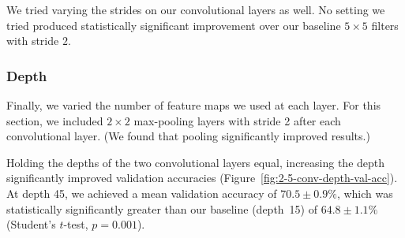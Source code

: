 \documentclass{article}
\begin{document}
\begin{multicols}{2}

We tried varying the strides on our convolutional layers as well.
No setting we tried produced statistically significant improvement
over our baseline $5\times 5$ filters with stride $2$.


\subsubsection{Depth}

Finally, we varied the number of feature maps
we used at each layer.
For this section,
we included $2\times 2$ max-pooling layers with stride 2
after each convolutional layer.
(We found that pooling significantly improved results.)

Holding the depths of the two convolutional layers equal,
increasing the depth significantly improved validation accuracies
(Figure~\ref{fig:2-5-conv-depth-val-acc}).
At depth 45, we achieved a mean validation accuracy of $70.5 \pm 0.9\%$,
which was statistically significantly greater
than our baseline (depth~15) of $64.8 \pm 1.1\%$
(Student's $t$-test, $p=0.001$).


\end{multicols}
\end{document}
